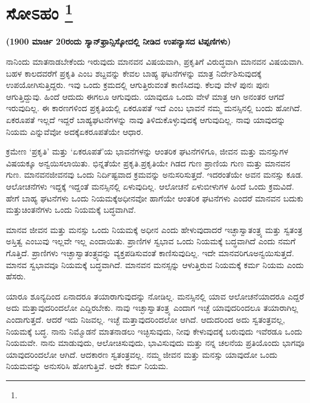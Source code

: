 
\chapter[ಸೋಽಹಂ ]{ಸೋಽಹಂ \protect\footnote{}}

\centerline{\textbf{(1900 ಮಾರ್ಚಿ 20ರಂದು ಸ್ಯಾನ್​ಫ್ರಾನ್ಸಿಸ್ಕೋದಲ್ಲಿ ನೀಡಿದ ಉಪನ್ಯಾಸದ ಟಿಪ್ಪಣಿಗಳು)}}

\vskip 0.3cm

ನಾನಿಂದು ಮಾತನಾಡಬೇಕೆಂದು ಇರುವುದು ಮಾನವನ ವಿಷಯವಾಗಿ, ಪ್ರಕೃತಿಗೆ ವಿರುದ್ಧವಾಗಿ ಮಾನವನ ವಿಷಯವಾಗಿ. ಬಹಳ ಕಾಲದವರೆಗೆ ಪ್ರಕೃತಿ ಎಂಬ ಶಬ್ದವನ್ನು ಕೇವಲ ಬಾಹ್ಯ ಘಟನೆಗಳನ್ನು ಮಾತ್ರ ನಿರ್ದೇಶಿಸುವುದಕ್ಕೆ ಉಪಯೋಗಿಸುತ್ತಿದ್ದರು. ಇವು ಒಂದು ಕ್ರಮದಲ್ಲಿ ಆಗುತ್ತಿರುವಂತೆ ಕಾಣಿಸಿದವು. ಕೆಲವು ವೇಳೆ ಪುನಃ ಪುನಃ ಆಗುತ್ತಿದ್ದುವು. ಹಿಂದೆ ಆದುದು ಈಗಲೂ ಆಗುವುದು. ಯಾವುದೂ ಒಂದು ವೇಳೆ ಮಾತ್ರ ಆಗಿ ಅನಂತರ ಆಗದೆ ಇರುವುದಿಲ್ಲ. ಈ ಕಾರಣಗಳಿಂದ ಪ್ರಕೃತಿಯಲ್ಲಿ ಏಕರೂಪತೆ ಇದೆ ಎಂಬ ಭಾವನೆ ನಮ್ಮ ಮನಸ್ಸಿನಲ್ಲಿ ಬಂದು ಹೋಗಿದೆ. ಏಕರೂಪತೆ ಇಲ್ಲದೆ ಇದ್ದರೆ ಬಾಹ್ಯಘಟನೆಗಳನ್ನು ನಾವು ತಿಳಿದುಕೊಳ್ಳುವುದಕ್ಕೆ ಆಗುವುದಿಲ್ಲ. ನಾವು ಯಾವುದನ್ನು ನಿಯಮ ಎನ್ನುವೆವೋ ಅದಕ್ಕೆ\break ಏಕರೂಪತೆಯೇ ಆಧಾರ.

ಕ್ರಮೇಣ ‘ಪ್ರಕೃತಿ’ ಮತ್ತು ‘ಏಕರೂಪತೆ’ಯ ಭಾವನೆಗಳನ್ನು ಆಂತರಿಕ ಘಟನೆಗಳಿಗೂ, ಜೀವನ ಮತ್ತು ಮನಸ್ಸುಗಳ ವಿಷಯಕ್ಕೂ ಅನ್ವಯಿಸಲಾಯಿತು. ಭಿನ್ನತೆಯೇ ಪ್ರಕೃತಿ.\break ಪ್ರಕೃತಿಯೇ ಗಿಡದ ಗುಣ ಪ್ರಾಣಿಯ ಗುಣ ಮತ್ತು ಮಾನವನ ಗುಣ. ಮಾನವನ\break ಜೀವನವು ಒಂದು ನಿರ್ದಿಷ್ಟವಾದ ಕ್ರಮವನ್ನು ಅನುಸರಿಸುತ್ತದೆ. ಇದರಂತೆಯೇ ಅವನ ಮನಸ್ಸು ಕೂಡ. ಆಲೋಚನೆಗಳು ಇದ್ದಕ್ಕೆ ಇದ್ದಂತೆ ಮನಸ್ಸಿನಲ್ಲಿ ಏಳುವುದಿಲ್ಲ. ಆಲೋಚನೆ ಏಳುಬೀಳುಗಳ ಹಿಂದೆ ಒಂದು ಕ್ರಮವಿದೆ. ಹೇಗೆ ಬಾಹ್ಯ ಘಟನೆಗಳು ಒಂದು ನಿಯಮಕ್ಕೆ\break ಅಧೀನವೋ ಹಾಗೆಯೇ ಆಂತರಿಕ ಘಟನೆಗಳು ಎಂದರೆ ಮಾನವನ ಬದುಕು ಮತ್ತು\break ಚಿಂತನೆಗಳು ಒಂದು ನಿಯಮಕ್ಕೆ ಬದ್ಧವಾಗಿವೆ.

ಮಾನವ ಜೀವನ ಮತ್ತು ಮನಸ್ಸು ಒಂದು ನಿಯಮಕ್ಕೆ ಅಧೀನ ಎಂದು ಹೇಳುವುದಾದರೆ ಇಚ್ಛಾಸ್ವಾತಂತ್ರ್ಯ ಮತ್ತು ಸ್ವತಂತ್ರ ಅಸ್ತಿತ್ವ ಎಂಬುವು ಇಲ್ಲವೇ ಇಲ್ಲ ಎಂದಾಯಿತು. ಪ್ರಾಣಿಗಳ ಸ್ವಭಾವ ಒಂದು ನಿಯಮಕ್ಕೆ ಬದ್ಧವಾಗಿದೆ ಎಂದು ನಮಗೆ ಗೊತ್ತಿದೆ. ಪ್ರಾಣಿಗಳು ಇಚ್ಛಾಸ್ವಾತಂತ್ರ್ಯವನ್ನು ವ್ಯಕ್ತಪಡಿಸುವಂತೆ ಕಾಣಿಸುವುದಿಲ್ಲ. ಇದೇ ಮಾನವರಿಗೂ\break ಅನ್ವಯಿಸುತ್ತದೆ. ಮಾನವ ಸ್ವಭಾವವೂ ನಿಯಮಕ್ಕೆ ಬದ್ಧವಾಗಿದೆ. ಮಾನವನ ಮನಸ್ಸನ್ನು ಆಳುತ್ತಿರುವ ನಿಯಮಕ್ಕೆ ಕರ್ಮ ನಿಯಮ ಎಂದು ಹೆಸರು.

ಯಾರೂ ಶೂನ್ಯದಿಂದ ಏನಾದರೂ ತಯಾರಾಗುವುದನ್ನು ನೋಡಿಲ್ಲ. ಮನಸ್ಸಿನಲ್ಲಿ ಯಾವ ಆಲೋಚನೆಯಾದರೂ ಎದ್ದರೆ ಅದು ಮತ್ತಾವುದರಿಂದಲೋ ಎದ್ದಿರಬೇಕು. ನಾವು ಇಚ್ಛಾಸ್ವಾತಂತ್ರ್ಯ ಎಂದಾಗ ಇಚ್ಛೆ ಯಾವುದರಿಂದಲೂ ತಯಾರಾಗಿಲ್ಲ ಎಂದಾಗುತ್ತದೆ. ಆದರೆ ಇದು ನಿಜವಲ್ಲ. ಇಚ್ಛೆ ಮತ್ತಾವುದರಿಂದಲೋ ಆಗಿದೆ. ಆದುದರಿಂದ ಅದು ಸ್ವತಂತ್ರವಲ್ಲ, ನಿಯಮಕ್ಕೆ ಬದ್ಧ. ನಾನು ನಿಮ್ಮೊಡನೆ ಮಾತನಾಡಲು ಇಚ್ಛಿಸುವುದು, ನೀವು ಕೇಳುವುದಕ್ಕೆ ಬರುವುದು ಇವೆರಡೂ ಒಂದು ನಿಯಮವೇ. ನಾನು ಮಾಡುವುದು, ಆಲೋಚಿಸುವುದು, ಭಾವಿಸುವುದು ಮತ್ತು ನನ್ನ ಚಲನೆಯ ಪ್ರತಿಯೊಂದು ಭಾಗವೂ ಯಾವುದರಿಂದಲೋ ಆಗಿದೆ. ಆದಕಾರಣ ಸ್ವತಂತ್ರವಲ್ಲ. ನಮ್ಮ ಜೀವನ ಮತ್ತು ಮನಸ್ಸು ಯಾವುದೋ ಒಂದು ನಿಯಮವನ್ನು ಅನುಸರಿಸಿ ಹೋಗುತ್ತಿವೆ. ಅದೇ ಕರ್ಮ ನಿಯಮ.

